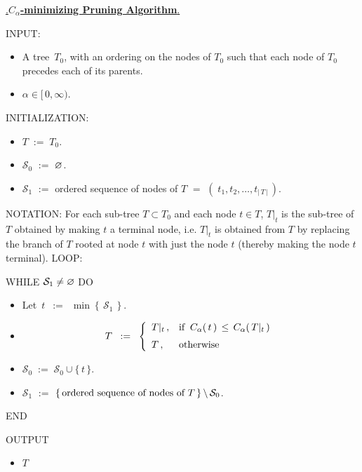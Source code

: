 \begin{center}
\begin{tcolorbox}[width=0.90\linewidth,colback=white,colframe=gray]
\begin{center}
\vskip 0.2cm
\underline{{\color{white}.}\textbf{\large$C_{\alpha}$-minimizing Pruning Algorithm}{\color{white}.}}
\end{center}
\vskip 0.5cm
INPUT:
\begin{itemize}
\item
	A tree \,$T_{0}$, with an ordering on the nodes of $T_{0}$
	such that each node of $T_{0}$ precedes each of its parents.
\item
	$\alpha \in [\,0,\infty)$.
\end{itemize}
\vskip 0.3cm
INITIALIZATION:
\begin{itemize}
\item
	$T \; := \; T_{0}$.
\item
	$\mathcal{S}_{0}$ \;$:=$\; $\varnothing$.
\item
	$\mathcal{S}_{1}$
	\;$:=$\;
		\textnormal{ordered sequence of nodes of $T$}
	\;$=$\;
		$\left(\;t_{1}, t_{2}, \ldots, t_{\vert\,T\,\vert}\,\right)$.
\end{itemize}
\vskip 0.3cm
NOTATION:
\vskip 0.1cm
For each sub-tree $T \subset T_{0}$ and each node $t \in T$,
$T\vert_{t}$ is the sub-tree of $T$ obtained by making $t$ a terminal node,
i.e. $T\vert_{t}$ is obtained from $T$ by replacing the branch of $T$ rooted at node $t$
with just the node $t$ (thereby making the node $t$ terminal).
\vskip 0.3cm
LOOP:
\vskip 0.1cm
\begin{center}
\begin{minipage}{0.85\linewidth}
WHILE \;$\mathcal{S}_{1} \neq \varnothing$\; DO
\begin{itemize}
\item
	Let \,$t$ \,$:=$\, $\min\!\left\{\,\mathcal{S}_{1}\,\right\}$.
\item
	\begin{equation*}
	T \;\; := \;\;
	\left\{\begin{array}{ll}
		T\vert_{t}\,, & \textnormal{if}\;\; C_{\alpha}(\,t\,) \,\leq\, C_{\alpha}(\,T\vert_{t}\,)
		\\
		T\,, & \overset{{\color{white}1}}{\textnormal{otherwise}}
		\end{array}\right.
	\end{equation*}
\item
	$\mathcal{S}_{0} \; := \; \mathcal{S}_{0} \cup \{\,t\,\}$.
\item
	$\mathcal{S}_{1}$
	\;$:=$\;
		$\left\{\,\textnormal{ordered sequence of nodes of $T$}\,\right\} \backslash \, \mathcal{S}_{0}$.
\end{itemize}
END
\end{minipage}
\end{center}
\vskip 0.3cm
OUTPUT
\begin{itemize}
\item
	$T$
\end{itemize}
\vskip 0.1cm
\end{tcolorbox}
\end{center}


